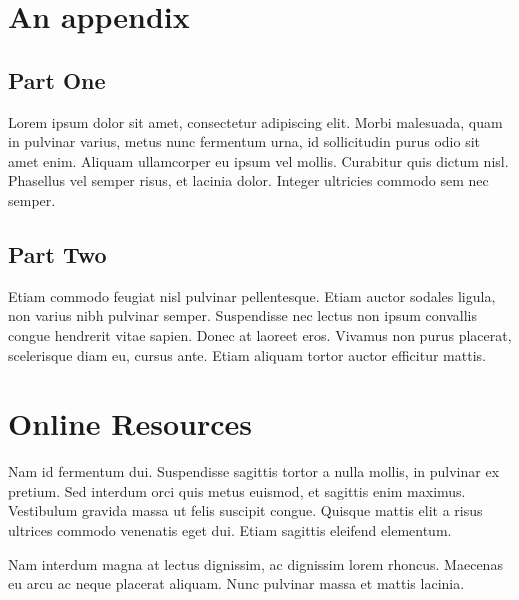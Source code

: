 \documentclass[sigconf,screen]{acmart}
\begin{document}



\appendix

\section{An appendix}

\subsection{Part One}

Lorem ipsum dolor sit amet, consectetur adipiscing elit. Morbi
malesuada, quam in pulvinar varius, metus nunc fermentum urna, id
sollicitudin purus odio sit amet enim. Aliquam ullamcorper eu ipsum
vel mollis. Curabitur quis dictum nisl. Phasellus vel semper risus, et
lacinia dolor. Integer ultricies commodo sem nec semper.

\subsection{Part Two}

Etiam commodo feugiat nisl pulvinar pellentesque. Etiam auctor sodales
ligula, non varius nibh pulvinar semper. Suspendisse nec lectus non
ipsum convallis congue hendrerit vitae sapien. Donec at laoreet
eros. Vivamus non purus placerat, scelerisque diam eu, cursus
ante. Etiam aliquam tortor auctor efficitur mattis.

\section{Online Resources}

Nam id fermentum dui. Suspendisse sagittis tortor a nulla mollis, in
pulvinar ex pretium. Sed interdum orci quis metus euismod, et sagittis
enim maximus. Vestibulum gravida massa ut felis suscipit
congue. Quisque mattis elit a risus ultrices commodo venenatis eget
dui. Etiam sagittis eleifend elementum.

Nam interdum magna at lectus dignissim, ac dignissim lorem
rhoncus. Maecenas eu arcu ac neque placerat aliquam. Nunc pulvinar
massa et mattis lacinia.
\end{document}
